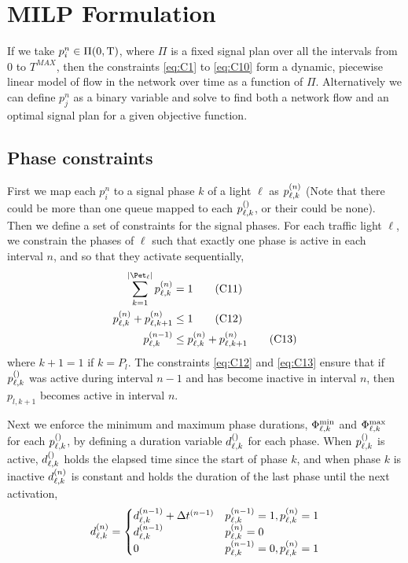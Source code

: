 \section{MILP Formulation}
If we take $p_i^n \in \Pi(0,\TMAX)$, where $\Pi$ is a fixed signal plan over all the intervals from 0 to $T^{MAX}$, then the constraints \ref{eq:C1} to \ref{eq:C10} form a dynamic, piecewise linear model of flow in the network over time as a function of $\Pi$. Alternatively we can define $p_j^n$ as a binary variable and solve to find both a network flow and an optimal signal plan for a given objective function.

\subsection{Phase constraints}
First we map each $p_i^n$ to a signal phase $k$ of a light $\ell$ as $\p{\ell}{k}$ (Note that there could be more than one queue mapped to each $\p[]{\ell}{k}$, or their could be none). Then we define a set of constraints for the signal phases. For each traffic light $\ell$, we constrain the phases of $\ell$ such that exactly one phase is active in each interval $n$, and so that they activate sequentially,
\begin{align}
\sum\limits_{k=1}^{\Pn} \p{\ell}{k} &= 1\tag{C11}\label{eq:C11}\\
\p{\ell}{k} + \p{\ell}{k+1} &\le 1\tag{C12}\label{eq:C12}\\
\p[n-1]{\ell}{k} &\le \p{\ell}{k} + \p{\ell}{k+1}\tag{C13}\label{eq:C13}
\end{align}
where $k+1=1$ if $k=P_l$. The constraints \ref{eq:C12} and \ref{eq:C13} ensure that if $\p[]{\ell}{k}$ was active during interval $n-1$ and has become inactive in interval $n$, then $p_{l,k+1}$ becomes active in interval $n$.

Next we enforce the minimum and maximum phase durations, $\PTMIN{\ell}{k}$ and $\PTMAX{\ell}{k}$ for each $\p[]{\ell}{k}$, by defining a duration variable $\pd[]{\ell}{k}$ for each phase. When $\p[]{\ell}{k}$ is active, $\pd[]{\ell}{k}$ holds the elapsed time since the start of phase $k$, and when phase $k$ is inactive $\pd{\ell}{k}$ is constant and holds the duration of the last phase until the next activation,
\begin{equation}
\pd{\ell}{k} = 
\begin{cases}
\pd[n-1]{\ell}{k} + \DT[n-1] & \p[n-1]{\ell}{k}=1,\p{\ell}{k}=1\\
\pd[n-1]{\ell}{k} & \p{\ell}{k}=0\\
0 & \p[n-1]{\ell}{k}=0,\p{\ell}{k}=1
\end{cases}
\end{equation}

